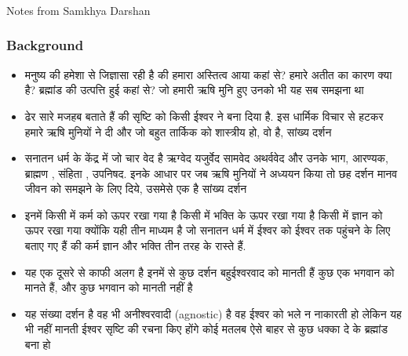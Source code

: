 \begin{frame}[fragile]\frametitle{}
\begin{center}
{\Large Notes from Samkhya Darshan}
\end{center}
\end{frame}

\begin{frame}[fragile]\frametitle{Background}

      \begin{itemize}
        \item मनुष्य की हमेशा से जिज्ञासा रही है की हमारा अस्तित्व आया कहां से? हमारे अतीत का कारण क्या है? ब्रह्मांड की उत्पत्ति हुई कहां से? जो हमारी ऋषि मुनि हुए उनको भी यह सब समझना था 
		\item  ढेर सारे मजहब बताते हैं की सृष्टि को किसी ईश्वर ने बना दिया है. इस धार्मिक विचार से हटकर हमारे ऋषि मुनियों ने दी  और जो बहुत तार्किक को शास्त्रीय हो, वो है, सांख्य दर्शन 
		\item सनातन धर्म के केंद्र में जो चार वेद है ऋग्वेद यजुर्वेद सामवेद अथर्ववेद और उनके भाग, आरण्यक, ब्राह्मण , संहिता ,  उपनिषद.  इनके आधार पर जब ऋषि मुनियों ने अध्ययन किया तो छह दर्शन मानव जीवन को समझने के लिए दिये, उसमेसे एक है सांख्य दर्शन 
		\item इनमें किसी में कर्म को ऊपर रखा गया है किसी में भक्ति के ऊपर रखा गया है किसी में ज्ञान को ऊपर रखा गया क्योंकि यही तीन
माध्यम है जो सनातन धर्म में ईश्वर को ईश्वर तक पहुंचने के लिए बताए गए हैं की कर्म ज्ञान और भक्ति तीन तरह के रास्ते हैं.
		\item यह एक दूसरे से काफी अलग है इनमें से कुछ दर्शन बहुईश्वरवाद को मानती हैं कुछ एक भगवान को मानते हैं, और कुछ
भगवान को मानती नहीं है 
\item यह संख्या दर्शन है वह भी अनीश्वरवादी  (agnostic) है वह ईश्वर को भले  न नाकारती हो लेकिन यह भी नहीं मानती ईश्वर सृष्टि की रचना किए होंगे कोई मतलब ऐसे बाहर से कुछ धक्का  दे के  ब्रह्मांड बना हो
      \end{itemize}



\end{frame}



